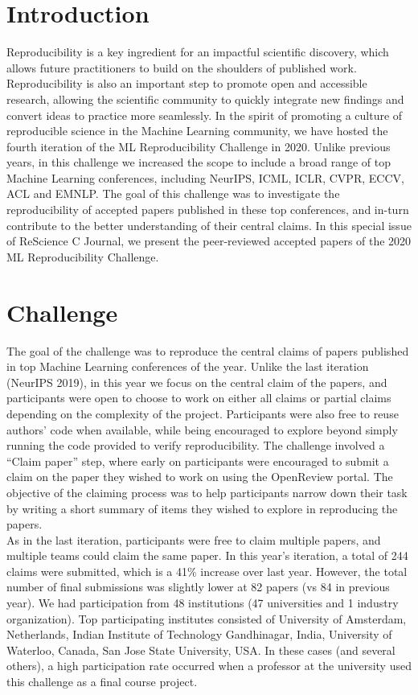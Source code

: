 

\section{Introduction}

Reproducibility is a key ingredient for an impactful scientific discovery, which allows future practitioners to build on the shoulders of published work. Reproducibility is also an important step to promote open and accessible research, allowing the scientific community to quickly integrate new findings and convert ideas to practice more seamlessly. In the spirit of promoting a culture of reproducible science in the Machine Learning community, we have hosted the fourth iteration of the ML Reproducibility Challenge in 2020. Unlike previous years, in this challenge we increased the scope to include a broad range of top Machine Learning conferences, including NeurIPS, ICML, ICLR, CVPR, ECCV, ACL and EMNLP. The goal of this challenge was to investigate the reproducibility of accepted papers published in these top conferences, and in-turn contribute to the better understanding of their central claims. In this special issue of ReScience C Journal, we present the peer-reviewed accepted papers of the 2020 ML Reproducibility Challenge.

\section{Challenge}

The goal of the challenge was to reproduce the central claims of papers published in top Machine Learning conferences of the year. Unlike the last iteration (NeurIPS 2019), in this year we focus on the central claim of the papers, and participants were open to choose to work on either all claims or partial claims depending on the complexity of the project. Participants were also free to reuse authors’ code when available, while being encouraged to explore beyond simply running the code provided to verify reproducibility. The challenge involved a “Claim paper” step, where early on  participants  were encouraged to submit a claim on the paper they wished to work on using the OpenReview portal. The objective of the claiming process was to help participants  narrow down their task by writing a short summary of items they wished to explore in reproducing the papers. \\

As in the last iteration, participants were free to claim multiple papers, and multiple teams could claim the same paper. In this year’s iteration, a total of 244 claims were submitted, which is a 41\% increase over last year. However, the total number of final submissions was slightly lower at 82 papers (vs 84 in previous year). We had participation from 48 institutions (47 universities and 1 industry organization). Top participating institutes consisted of University of Amsterdam, Netherlands, Indian Institute of Technology Gandhinagar, India, University of Waterloo, Canada, San Jose State University, USA. In these cases (and several others), a high participation rate occurred when a professor at the university used this challenge as a final course project. \\

